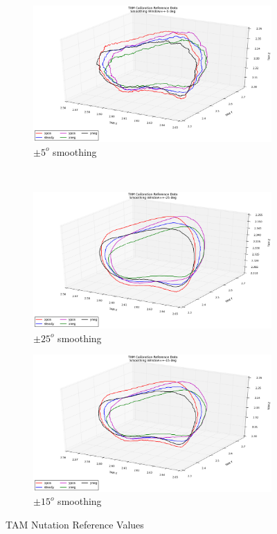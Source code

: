 \begin{figure}[H]
  \begin{subfigure}[h!]{0.5\textwidth}
    \includegraphics[width=\textwidth]{figures/tam_calibration_ref_5deg_smoothing.eps}
    \caption{$\pm 5^o$ smoothing}
    \label{fig:TAM5degCalibration}
  \end{subfigure}
  ~
  \begin{subfigure}[h!]{0.5\textwidth}
    \includegraphics[width=\textwidth]{figures/tam_calibration_ref_25deg_smoothing.eps}
    \caption{$\pm 25^o$ smoothing}
    \label{fig:TAM25degCalibration}
  \end{subfigure}

  \begin{subfigure}[h!]{0.8\textwidth}
    \includegraphics[width=\textwidth]{figures/tam_calibration_ref_15deg_smoothing.eps}
    \caption{$\pm 15^o$ smoothing}
    \label{fig:TAM15degCalibration}
  \end{subfigure}
  \caption{TAM Nutation Reference Values}
  \label{fig:TAMNutationReference}
\end{figure}

